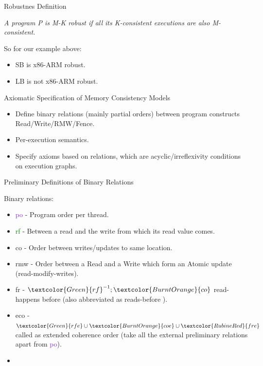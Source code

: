 \documentclass[notes, xcolor=dvipsnames]{beamer}
\newcommand{\po}{\textcolor{BlueViolet}{po}}
\newcommand{\rf}{\textcolor{Green}{rf}}
\newcommand{\co}{\textcolor{BurntOrange}{co}}
\newcommand{\coe}{\textcolor{BurntOrange}{coe}}
\newcommand{\fr}{\textcolor{RubineRed}{fr}}
\newcommand{\fre}{\textcolor{RubineRed}{fre}}
\newcommand{\rfe}{\textcolor{Green}{rfe}}
\newcommand{\eco}{\textcolor{WildStrawberry}{eco}}
\newcommand{\rmw}{\textcolor{Bittersweet}{rmw}}
\begin{document}
    \begin{frame}{Robustnes Definition}

        \begin{center}
            \textit{A program P is M-K robust if all its K-consistent executions are also M-consistent.} 
        \end{center}
        
        So for our example above:
        \begin{itemize}
            \item SB is x86-ARM robust.
            \item LB is not x86-ARM robust.
        \end{itemize} 

    \end{frame}

    \begin{frame}{Axiomatic Specification of Memory Consistency Models}

        \begin{itemize}
            \item Define binary relations (mainly partial orders) between program constructs Read/Write/RMW/Fence. 
            \item Per-execution semantics. 
            \item Specify axioms based on relations, which are acyclic/irreflexivity conditions on execution graphs. 
        \end{itemize}

    \end{frame}

    \begin{frame}{Preliminary Definitions of Binary Relations}

        Binary relations:
        \begin{itemize}
            \item {\po} - Program order per thread.
            \item {\rf} - Between a read and the write from which its read value comes.
            \item {\co} - Order between writes/updates to same location.
            \item {\rmw} - Order between a Read and a Write which form an Atomic update (read-modify-writes).
            \item {\fr} - $\rf^{-1};\co$ read-happens before (also abbreviated as reads-before ).
            \item {\eco} - $\rfe \cup \coe \cup \fre$ called as extended coherence order (take all the external preliminary relations apart from \po).
            \item 
        \end{itemize}


    \end{frame}
\end{document}
